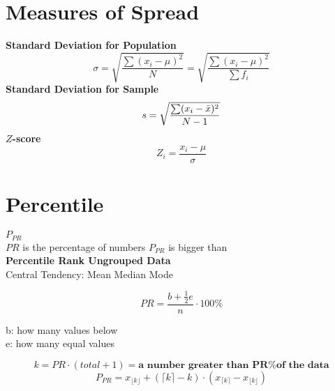\documentclass{article}
\begin{document}
\section{Measures of Spread}
\textbf{Standard Deviation for Population}\\
\[\sigma = \sqrt{\frac{\sum(x_i-\mu)^2}{N}} = \sqrt{\frac{\sum(x_i-\mu)^2}{\sum f_i}} \]
\textbf{Standard Deviation for Sample}\\
\[s = \sqrt{\frac{\sum(x_i-\Bar{x})^2}{N-1}}\]
\textbf{\(Z\)-score}\\
\[Z_i = \frac{x_i-\mu}{\sigma}\]
\section{Percentile}
\Large \textbf{\(P_{PR}\)}\\
\normalsize \(PR\) is the percentage of numbers \(P_{PR}\) is bigger than\\
\textbf{Percentile Rank Ungrouped Data}\\
Central Tendency: Mean Median Mode\\
\begin{minipage}[t]{0.5\textwidth}
\[PR = \frac{b + \frac{1}{2}e}{n} \cdot 100\%\]
\end{minipage}
\begin{minipage}[t]{0.6\textwidth}
\vspace{0.3em}
b: how many values below\\
e: how many equal values
\end{minipage}
\[k = PR \cdot (total + 1) = \textbf{a number greater than PR\% of the data}\]
\[P_{PR} = x_{\lfloor k \rfloor} + (\lceil k \rceil - k) \cdot (x_{\lceil k \rceil} - x_{\lfloor k \rfloor})\]
\end{document}
